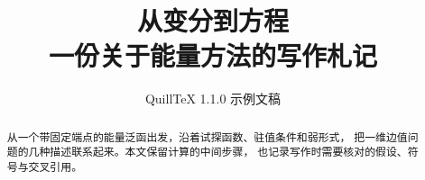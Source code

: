 \documentclass[UTF8,fontset=mac,zihao=-4]{ctexart}
\title{从变分到方程\\[0.5em]\large 一份关于能量方法的写作札记}
\author{QuillTeX 1.1.0 示例文稿}
\date{}
\begin{document}
\maketitle
\begin{abstract}
从一个带固定端点的能量泛函出发，沿着试探函数、驻值条件和弱形式，
把一维边值问题的几种描述联系起来。本文保留计算的中间步骤，
也记录写作时需要核对的假设、符号与交叉引用。
\end{abstract}



\end{document}
